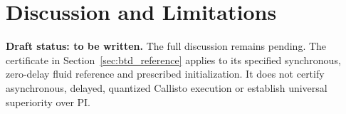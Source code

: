 \section{Discussion and Limitations}
\label{sec:discussion}
\noindent\textbf{Draft status: to be written.}
The full discussion remains pending. The certificate in
Section~\ref{sec:btd_reference} applies to its specified synchronous,
zero-delay fluid reference and prescribed initialization. It does not
certify asynchronous, delayed, quantized Callisto execution or establish
universal superiority over PI.
